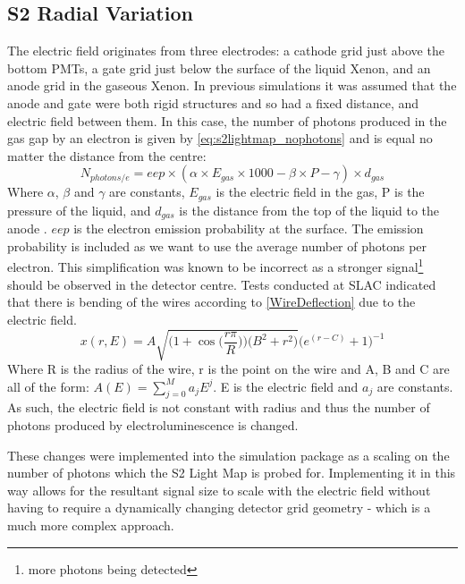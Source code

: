 \subsection{S2 Radial Variation} \label{sec:s2radialvariation}
\par
The electric field originates from three electrodes: a cathode grid just above the bottom PMTs, a gate grid just below the surface of the liquid Xenon, and an anode grid in the gaseous Xenon.
In previous simulations it was assumed that the anode and gate were both rigid structures and so had a fixed distance, and electric field between them.
In this case, the number of photons produced in the gas gap by an electron is given by \autoref{eq:s2lightmap_nophotons} and is equal no matter the distance from the centre:
\begin{equation}
    N_{photons/e} = eep \times (\alpha \times E_{gas} \times 1000 - \beta \times P - \gamma) \times d_{gas}
    \label{eq:s2lightmap_nophotons}
\end{equation}
Where $\alpha$, $\beta$ and $\gamma$ are constants, $E_{gas}$ is the electric field in the gas, P is the pressure of the liquid, and $d_{gas}$ is the distance from the top of the liquid to the anode \cite{NoPhotonsPerElectron}.
$eep$ is the electron emission probability at the surface.
The emission probability is included as we want to use the average number of photons per electron.
This simplification was known to be incorrect as a stronger signal\footnote{more photons being detected} should be observed in the detector centre.
Tests conducted at SLAC indicated that there is bending of the wires according to \autoref{WireDeflection} due to the electric field.
\begin{equation}
    x(r,E) = A \sqrt{ \bigg( 1 + \cos{ \Big( \frac{r \pi}{R} } \Big) \bigg) \bigg( B^2 + r^2 \bigg) } \bigg( e^{(r-C)} + 1 \bigg)^{-1} 
    \label{WireDeflection}
\end{equation}
Where R is the radius of the wire, r is the point on the wire and A, B and C are all of the form: $A(E) = \sum_{j=0}^{M} a_{j} E^{j}$. E is the electric field and $a_{j}$ are constants.
As such, the electric field is not constant with radius and thus the number of photons produced by electroluminescence is changed.
\par
These changes were implemented into the simulation package as a scaling on the number of photons which the S2 Light Map is probed for.
Implementing it in this way allows for the resultant signal size to scale with the electric field without having to require a dynamically changing detector grid geometry - which is a much more complex approach.
